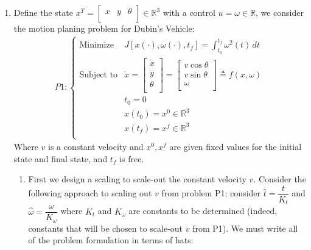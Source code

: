 \documentclass[10pt]{article}
\newcommand{\mat}[2][ccccccccccccccc]{\left [\!\!\begin{array}{#1} #2\\ \end{array} \!\!\right]}
\newcommand{\piece}[2][cll]{\left \{\begin{array}{#1} #2\\ \end{array} \right. }
\newcommand{\bbr}{\mathbb{R}}
\begin{document}
\begin{enumerate}[leftmargin=*]
\item Define the state $x^T = \mat{x & y & \theta }\in\bbr^3$ with a control $u=\omega\in\bbr$, we consider the motion planing problem for Dubin's Vehicle:
    \begin{align*}
        P1 : \piece{ \text{Minimize} & J[x(\cdot), \omega(\cdot), t_f] = \int_{t_0}^{t_f}\omega^2(t)\,dt \\
                    \text{Subject to} & \dot x = \mat{\dot x \\ \dot y \\ \theta}
                                               = \mat{v\cos\theta \\ v\sin\theta \\ \omega}\triangleq f(x,\omega) \\
                     & t_0 = 0 \\
                     & x(t_0)=x^0\in\bbr^3 \\
                     & x(t_f)=x^f\in\bbr^3
                     }
    \end{align*}
    Where $v$ is a constant velocity and $x^0,x^f$ are given fixed values for the initial state and final state, and $t_f$ is free.
    \begin{enumerate}
      \item First we design a scaling to scale-out the constant velocity $v$.  Consider the following approach to scaling out $v$ from problem P1; consider $\hat t = \dfrac{t}{K_t}$ and $\hat\omega=\dfrac{\omega}{K_\omega}$ where $K_t$ and $K_\omega$ are constants to be determined (indeed, constants that will be chosen to scale-out $v$ from P1).  We must write all of the problem formulation in terms of hats:


\end{enumerate}
\end{enumerate}
\end{document}
